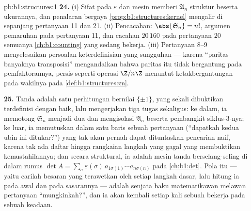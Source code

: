 \begin{solution}{pb:b1:structures:1}
\textbf{24.} (i) Sifat  pada $\varepsilon$ dan
mesin  memberi $\mathfrak A_n$ struktur  beserta
ukurannya, dan penalaran bergaya \cref{prop:b1:structures:kernel}
mengalir di sepanjang pertanyaan 11 dan 21. (ii) Pencacahan:
$\abs{\mathfrak S_n} = n!$, argumen pemaruhan pada pertanyaan 11,
dan cacahan $20\,160$ pada pertanyaan 20 semuanya
\cref{ch:b1:counting} yang sedang bekerja. (iii) Pertanyaan 8--9 menyelesaikan
persoalan keterdefinisian yang sungguhan --- karena ``paritas banyaknya
transposisi'' mengandaikan bahwa paritas itu tidak bergantung
pada pemfaktorannya, persis seperti operasi $\Z/n\Z$ menuntut
ketakbergantungan pada wakilnya pada \cref{def:b1:structures:zn}.

\textbf{25.} Tanda adalah satu perhitungan bernilai $\{\pm1\}$,
yang sekali dibuktikan terdefinisi dengan baik, lalu mengerjakan tiga
tugas sekaligus: ke dalam, ia memotong $\mathfrak S_n$ menjadi dua dan
mengisolasi $\mathfrak A_n$ beserta pembangkit siklus-$3$-nya;
ke luar, ia memutuskan dalam satu baris sebuah pertanyaan (``dapatkah kedua
ubin ini ditukar?'') yang tak akan pernah dapat dituntaskan pencarian naif, karena
tak ada daftar hingga rangkaian langkah yang gagal yang membuktikan kemustahilannya; dan
secara struktural, ia adalah mesin tanda berselang-seling di dalam
rumus $\det A = \sum_\sigma \varepsilon(\sigma)\,
a_{1\sigma(1)}\cdots a_{n\sigma(n)}$ pada \cref{ch:b1:det}. Pola
itu --- yaitu carilah besaran yang terawetkan oleh setiap langkah dasar,
lalu hitung ia pada awal dan pada sasarannya --- adalah senjata baku
matematikawan melawan pertanyaan ``mungkinkah?'',
dan ia akan kembali setiap kali sebuah  bekerja pada sebuah 
keadaan.

\end{solution}
